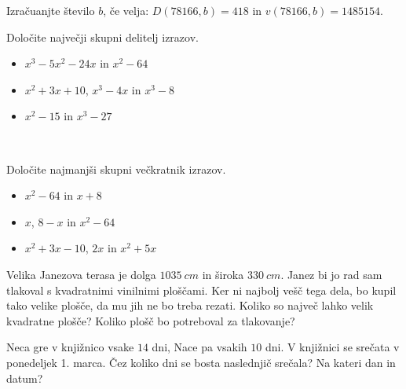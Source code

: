             \begin{naloga}
                Izračuanjte število $b$, če velja: $D(78 166, b)=418$ in $v(78 166, b)=1 485 154$. 
            \end{naloga}

            \begin{naloga}
                Določite največji skupni delitelj izrazov.
                \begin{itemize}
                    \item $x^3-5x^2-24x$ in $x^2-64$ 
                    \item $x^2+3x+10$, $x^3-4x$ in $x^3-8$ 
                    \item $x^2-15$ in $x^3-27$ 
                \end{itemize}
            \end{naloga}
~
            \begin{naloga}
                Določite najmanjši skupni večkratnik izrazov.
                \begin{itemize}
                    \item $x^2-64$ in $x+8$ 
                    \item $x$, $8-x$ in $x^2-64$ 
                    \item $x^2+3x-10$, $2x$ in $x^2+5x$ 
                \end{itemize}
            \end{naloga}

            \begin{naloga}
                Velika Janezova terasa je dolga $1035~cm$ in široka $330~cm$. Janez bi jo rad sam tlakoval s kvadratnimi vinilnimi ploščami.
                Ker ni najbolj vešč tega dela, bo kupil tako velike plošče, da mu jih ne bo treba rezati.
                Koliko so največ lahko velik kvadratne plošče? Koliko plošč bo potreboval za tlakovanje? 
            \end{naloga}

            \begin{naloga}
                Neca gre v knjižnico vsake $14$ dni, Nace pa vsakih $10$ dni. V knjižnici se srečata v ponedeljek 1. marca.
                Čez koliko dni se bosta naslednjič srečala? Na kateri dan in datum?                     
            \end{naloga}

        